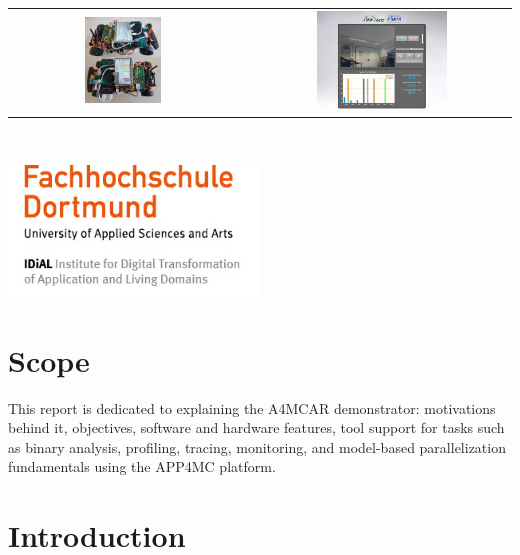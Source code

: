 \begin{tabularx}{\textwidth}{cXc}
	\includegraphics[width=0.35\textwidth]{content/images/a4mcar.png}&&
	\includegraphics[width=0.53\textwidth]{content/images/web.png}
\end{tabularx}
\vspace{20pt}\\

\centerline{\includegraphics[width=0.5\textwidth]{content/images/fhidial.jpg}} 

\newpage
\tableofcontents
\newpage

\section{Scope}
This report is dedicated to explaining the A4MCAR demonstrator: motivations behind it, objectives, software and hardware features, tool support for tasks such as binary analysis, profiling, tracing, monitoring, and model-based parallelization fundamentals using the APP4MC platform.

\section{Introduction}
